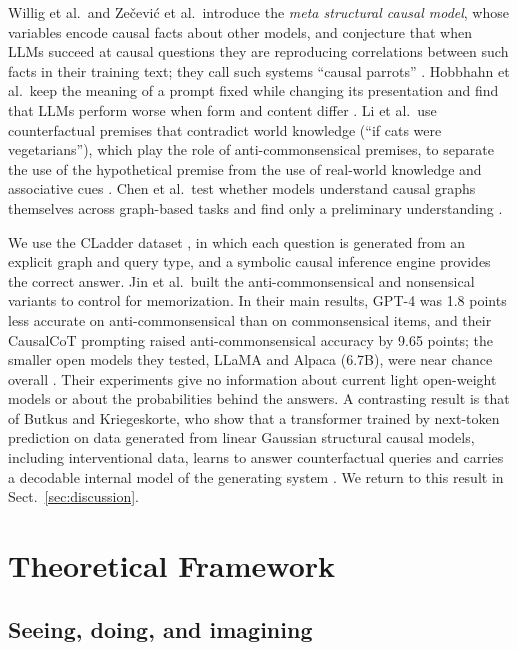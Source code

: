 \documentclass{llncs}
\begin{document}
Willig et al.\ and Zečević et al.\ introduce the \emph{meta structural causal model}, whose variables encode causal facts about other models, and conjecture that when LLMs succeed at causal questions they are reproducing correlations between such facts in their training text; they call such systems ``causal parrots'' \cite{willig2022can,Zecevic2023CausalPL}. Hobbhahn et al.\ keep the meaning of a prompt fixed while changing its presentation and find that LLMs perform worse when form and content differ \cite{hobbhahn2022investigating}. Li et al.\ use counterfactual premises that contradict world knowledge (``if cats were vegetarians''), which play the role of anti-commonsensical premises, to separate the use of the hypothetical premise from the use of real-world knowledge and associative cues \cite{li2023counterfactual}. Chen et al.\ test whether models understand causal graphs themselves across graph-based tasks and find only a preliminary understanding \cite{chen2024clear}.

We use the CLadder dataset \cite{jin2023cladder}, in which each question is generated from an explicit graph and query type, and a symbolic causal inference engine provides the correct answer. Jin et al.\ built the anti-commonsensical and nonsensical variants to control for memorization. In their main results, GPT-4 was 1.8 points less accurate on anti-commonsensical than on commonsensical items, and their CausalCoT prompting raised anti-commonsensical accuracy by 9.65 points; the smaller open models they tested, LLaMA and Alpaca (6.7B), were near chance overall \cite{jin2023cladder}. Their experiments give no information about current light open-weight models or about the probabilities behind the answers. A contrasting result is that of Butkus and Kriegeskorte, who show that a transformer trained by next-token prediction on data generated from linear Gaussian structural causal models, including interventional data, learns to answer counterfactual queries and carries a decodable internal model of the generating system \cite{butkus2025causal}. We return to this result in Sect.~\ref{sec:discussion}.

\section{Theoretical Framework}
\label{sec:theory}

\subsection{Seeing, doing, and imagining}
\label{sec:ladder}
\end{document}
